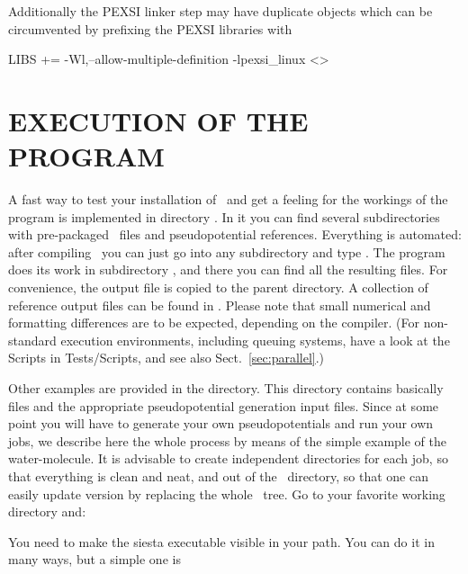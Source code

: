 \begin{description}
  Additionally the PEXSI linker step may have duplicate objects which
  can be circumvented by prefixing the PEXSI libraries with
\begin{shellexample}
  LIBS += -Wl,--allow-multiple-definition -lpexsi_linux <>
\end{shellexample}

\end{description}



\section{EXECUTION OF THE PROGRAM}

A fast way to test your installation of \siesta\ and get a feeling for
the workings of the program is implemented in directory
. In it you can find several subdirectories
with pre-packaged \fdflib\ files and pseudopotential references. Everything
is automated: after compiling \siesta\ you can just go into any
subdirectory and type . The program does its work in
subdirectory , and there you can find all the resulting
files. For convenience, the output file is copied to the parent
directory. A collection of reference output files can be found in
. Please note that small numerical and
formatting differences are to be expected, depending on the compiler.
(For non-standard execution environments, including queuing systems,
have a look at the Scripts in Tests/Scripts, and see also
Sect.~\ref{sec:parallel}.)

Other examples are provided in the  directory. This
directory contains basically  files and the appropriate
pseudopotential generation input files. Since at some point you will
have to generate your own pseudopotentials and run your own jobs, we
describe here the whole process by means of the simple example of the
water-molecule. It is advisable to create independent directories for
each job, so that everything is clean and neat, and out of the \siesta\ directory, so that one can easily update version by replacing
the whole \siesta\ tree. Go to your favorite working directory
and:


You need to make the siesta executable visible in your path. 
You can do it in many ways, but a simple one is

